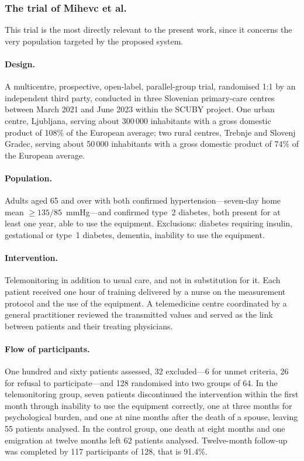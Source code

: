 \documentclass[12pt,a4paper,oneside]{report}
\begin{document}
\subsubsection{The trial of Mihevc et al.}\label{sec:mihevc}

This trial is the most directly relevant to the present work, since it concerns the very population targeted by the proposed system.

\paragraph{Design.} A multicentre, prospective, open-label, parallel-group trial, randomised 1:1 by an independent third party, conducted in three Slovenian primary-care centres between March 2021 and June 2023 within the SCUBY project. One urban centre, Ljubljana, serving about 300\,000 inhabitants with a gross domestic product of 108\% of the European average; two rural centres, Trebnje and Slovenj Gradec, serving about 50\,000 inhabitants with a gross domestic product of 74\% of the European average.

\paragraph{Population.} Adults aged 65 and over with both confirmed hypertension---seven-day home mean $\geq 135/85$~mmHg---and confirmed type~2 diabetes, both present for at least one year, able to use the equipment. Exclusions: diabetes requiring insulin, gestational or type~1 diabetes, dementia, inability to use the equipment.

\paragraph{Intervention.} Telemonitoring in addition to usual care, and not in substitution for it. Each patient received one hour of training delivered by a nurse on the measurement protocol and the use of the equipment. A telemedicine centre coordinated by a general practitioner reviewed the transmitted values and served as the link between patients and their treating physicians.

\paragraph{Flow of participants.} One hundred and sixty patients assessed, 32 excluded---6 for unmet criteria, 26 for refusal to participate---and 128 randomised into two groups of 64. In the telemonitoring group, seven patients discontinued the intervention within the first month through inability to use the equipment correctly, one at three months for psychological burden, and one at nine months after the death of a spouse, leaving 55 patients analysed. In the control group, one death at eight months and one emigration at twelve months left 62 patients analysed. Twelve-month follow-up was completed by 117 participants of 128, that is 91.4\%.
\end{document}
